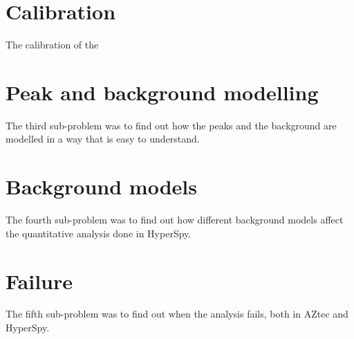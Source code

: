 \section{Calibration}
\label{sec:results:calibration}
The calibration of the



\section{Peak and background modelling}
\label{sec:results:modelling}
The third sub-problem was to find out how the peaks and the background are modelled in a way that is easy to understand.


\section{Background models}
\label{sec:results:background}
The fourth sub-problem was to find out how different background models affect the quantitative analysis done in HyperSpy.


\section{Failure}
\label{sec:results:failure}
The fifth sub-problem was to find out when the analysis fails, both in AZtec and HyperSpy.
